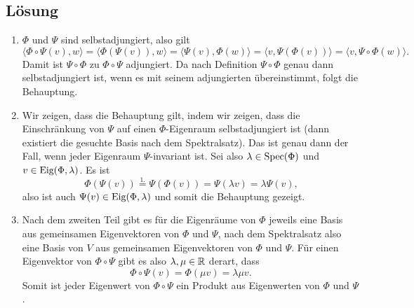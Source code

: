 \subsection{Lösung}
\begin{enumerate}
	\item \( \Phi \) und \( \Psi \) sind selbstadjungiert, also gilt
		\begin{equation*}
			\langle \Phi \circ \Psi(v),w \rangle = \langle \Phi(\Psi(v)),w \rangle = \langle \Psi(v),\Phi(w) \rangle = \langle v, \Psi(\Phi(v)) \rangle = \langle v,\Psi \circ \Phi(w) \rangle\text{.}
		\end{equation*}
		Damit ist \( \Psi \circ \Phi \) zu \( \Phi \circ \Psi \) adjungiert. Da nach Definition \( \Psi \circ \Phi \) genau dann selbstadjungiert ist, wenn es mit seinem adjungierten übereinstimmt, folgt die Behauptung.

	\item Wir zeigen, dass die Behauptung gilt, indem wir zeigen, dass die Einschränkung von \( \Psi \) auf einen \( \Phi \)-Eigenraum selbstadjungiert ist (dann existiert die gesuchte Basis nach dem Spektralsatz). Das ist genau dann der Fall, wenn jeder Eigenraum \( \Psi \)-invariant ist. Sei also \( \lambda \in \text{Spec}(\Phi) \) und \( v \in \text{Eig}(\Phi,\lambda) \). Es ist
		\begin{equation*}
			\Phi(\Psi(v)) \overset{\text{1.}}{=} \Psi(\Phi(v)) = \Psi(\lambda v) = \lambda \Psi(v)\text{,}
		\end{equation*}
		also ist auch \( \Psi(v) \in \text{Eig}(\Phi,\lambda) \) und somit die Behauptung gezeigt.

	\item Nach dem zweiten Teil gibt es für die Eigenräume von \( \Phi \) jeweils eine Basis aus gemeinsamen Eigenvektoren von \( \Phi \) und \( \Psi \), nach dem Spektralsatz also eine Basis von \( V \) aus gemeinsamen Eigenvektoren von \( \Phi \) und \( \Psi \). Für einen Eigenvektor von \( \Phi \circ \Psi \) gibt es also \( \lambda, \mu \in \mathbb{R} \) derart, dass
	\begin{equation*}
		\Phi \circ \Psi(v) = \Phi(\mu v) = \lambda\mu v\text{.}
	\end{equation*}
	Somit ist jeder Eigenwert von \( \Phi \circ \Psi \) ein Produkt aus Eigenwerten von \( \Phi \) und \( \Psi \).

\end{enumerate}

\newpage

